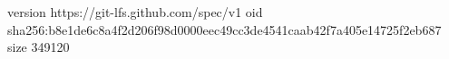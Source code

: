 version https://git-lfs.github.com/spec/v1
oid sha256:b8e1de6c8a4f2d206f98d0000eec49cc3de4541caab42f7a405e14725f2eb687
size 349120

